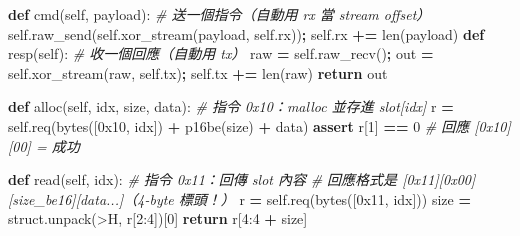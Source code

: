\documentclass[10pt,a4paper]{article}
\newenvironment{Shaded}{\begin{snugshade}}{\end{snugshade}}
\newcommand{\BaseNTok}[1]{\textcolor[rgb]{0.00,0.00,0.81}{#1}}
\newcommand{\BuiltInTok}[1]{#1}
\newcommand{\CommentTok}[1]{\textcolor[rgb]{0.56,0.35,0.01}{\textit{#1}}}
\newcommand{\ControlFlowTok}[1]{\textcolor[rgb]{0.13,0.29,0.53}{\textbf{#1}}}
\newcommand{\DecValTok}[1]{\textcolor[rgb]{0.00,0.00,0.81}{#1}}
\newcommand{\KeywordTok}[1]{\textcolor[rgb]{0.13,0.29,0.53}{\textbf{#1}}}
\newcommand{\NormalTok}[1]{#1}
\newcommand{\OperatorTok}[1]{\textcolor[rgb]{0.81,0.36,0.00}{\textbf{#1}}}
\newcommand{\StringTok}[1]{\textcolor[rgb]{0.31,0.60,0.02}{#1}}
\newcommand{\VariableTok}[1]{\textcolor[rgb]{0.00,0.00,0.00}{#1}}
\renewenvironment{Shaded}{%
  \def\FrameCommand{\fboxsep=3.2pt\colorbox{shadecolor}}%
  \MakeFramed{\advance\hsize-\width\FrameRestore\small}%
}{%
  \endMakeFramed
}
\begin{document}
\begin{Shaded}
\begin{Highlighting}[]
    \KeywordTok{def}\NormalTok{ cmd(}\VariableTok{self}\NormalTok{, payload):                 }\CommentTok{\# 送一個指令（自動用 rx 當 stream offset）}
        \VariableTok{self}\NormalTok{.raw\_send(}\VariableTok{self}\NormalTok{.xor\_stream(payload, }\VariableTok{self}\NormalTok{.rx))}\OperatorTok{;} \VariableTok{self}\NormalTok{.rx }\OperatorTok{+=} \BuiltInTok{len}\NormalTok{(payload)}
    \KeywordTok{def}\NormalTok{ resp(}\VariableTok{self}\NormalTok{):                         }\CommentTok{\# 收一個回應（自動用 tx）}
\NormalTok{        raw }\OperatorTok{=} \VariableTok{self}\NormalTok{.raw\_recv()}\OperatorTok{;}\NormalTok{ out }\OperatorTok{=} \VariableTok{self}\NormalTok{.xor\_stream(raw, }\VariableTok{self}\NormalTok{.tx)}\OperatorTok{;} \VariableTok{self}\NormalTok{.tx }\OperatorTok{+=} \BuiltInTok{len}\NormalTok{(raw)}
        \ControlFlowTok{return}\NormalTok{ out}
\end{Highlighting}
\end{Shaded}

\begin{Shaded}
\begin{Highlighting}[]
    \KeywordTok{def}\NormalTok{ alloc(}\VariableTok{self}\NormalTok{, idx, size, data):       }\CommentTok{\# 指令 0x10：malloc 並存進 slot[idx]}
\NormalTok{        r }\OperatorTok{=} \VariableTok{self}\NormalTok{.req(}\BuiltInTok{bytes}\NormalTok{([}\BaseNTok{0x10}\NormalTok{, idx]) }\OperatorTok{+}\NormalTok{ p16be(size) }\OperatorTok{+}\NormalTok{ data)}
        \ControlFlowTok{assert}\NormalTok{ r[}\DecValTok{1}\NormalTok{] }\OperatorTok{==} \DecValTok{0}                    \CommentTok{\# 回應 [0x10][00] = 成功}
\end{Highlighting}
\end{Shaded}

\begin{Shaded}
\begin{Highlighting}[]
    \KeywordTok{def}\NormalTok{ read(}\VariableTok{self}\NormalTok{, idx):                    }\CommentTok{\# 指令 0x11：回傳 slot 內容}
        \CommentTok{\# 回應格式是 [0x11][0x00][size\_be16][data...]（4{-}byte 標頭！）}
\NormalTok{        r }\OperatorTok{=} \VariableTok{self}\NormalTok{.req(}\BuiltInTok{bytes}\NormalTok{([}\BaseNTok{0x11}\NormalTok{, idx]))}
\NormalTok{        size }\OperatorTok{=}\NormalTok{ struct.unpack(}\StringTok{\textquotesingle{}\textgreater{}H\textquotesingle{}}\NormalTok{, r[}\DecValTok{2}\NormalTok{:}\DecValTok{4}\NormalTok{])[}\DecValTok{0}\NormalTok{]}
        \ControlFlowTok{return}\NormalTok{ r[}\DecValTok{4}\NormalTok{:}\DecValTok{4} \OperatorTok{+}\NormalTok{ size]}
\end{Highlighting}
\end{Shaded}
\end{document}
